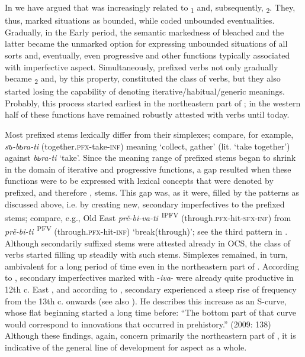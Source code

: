 \documentclass[output=paper]{langsci/langscibook}
\begin{document}
In  we have argued that  was increasingly related to \textsubscript{1} and, subsequently, \textsubscript{2}. They, thus, marked situations as bounded, while  coded unbounded eventualities. Gradually, in the Early  period, the semantic markedness of  bleached and the latter became the unmarked option for expressing unbounded situations of all sorts and, eventually, even progressive and other functions typically associated with imperfective aspect. Simultaneously, prefixed verbs not only gradually became \textsubscript{2} and, by this property, constituted the class of  verbs, but they also started losing the capability of denoting iterative/habitual/generic meanings. Probably, this process started earliest in the northeastern part of ; in the western half of  these functions have remained robustly attested with  verbs until today.

Most prefixed stems lexically differ from their simplexes; compare, for example, \textit{s}\textit{ъ}\textit{-b}\textit{ь}\textit{ra-ti} (together.\textsc{pfx}-take-\textsc{inf}) meaning ‘collect, gather’ (lit. ‘take together’) against \textit{b}\textit{ь}\textit{ra-ti} ‘take’. Since the meaning range of prefixed stems began to shrink in the domain of iterative and progressive functions, a gap resulted when these functions were to be expressed with lexical concepts that were denoted by prefixed, and therefore , stems. This gap was, as it were, filled by the  patterns as discussed above, i.e. by creating new, secondary imperfectives to the prefixed stems; compare, e.g., Old East  \textit{prě-bi-va-ti}\textsuperscript{~}\textsuperscript{IPFV} (through.\textsc{pfx}-hit-\textsc{sfx}-\textsc{inf}) from \textit{prě-bi-ti}\textsuperscript{~}\textsuperscript{PFV} (through.\textsc{pfx}-hit-\textsc{inf}) ‘break\linebreak (through)’; see the third pattern in . Although secondarily suffixed stems were attested already in OCS, the class of  verbs started filling up steadily with such stems. Simplexes remained, in turn, ambivalent for a long period of time even in the northeastern part of . According to \citet[208--212]{Ševeleva2010}, secondary imperfectives marked with -\textit{iva}- were already quite productive in 12th c. East , and according to \citet[131]{Andersen2009}, secondary  experienced a steep rise of frequency from the 13th c. onwards (see also ). He describes this increase as an S-curve, whose flat beginning started a long time before: “The bottom part of that curve would correspond to innovations that occurred in prehistory.” (2009: 138) Although these findings, again, concern primarily the northeastern part of , it is indicative of the general line of development for  aspect as a whole.
\end{document}
